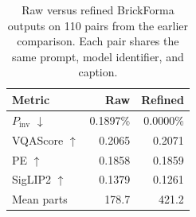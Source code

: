 \begin{table}[t]
\centering
\small
\begin{tabular}{lrr}
\toprule
Metric & Raw & Refined \\
\midrule
$P_{\mathrm{inv}}$ $\downarrow$ & 0.1897\% & 0.0000\% \\
VQAScore $\uparrow$ & 0.2065 & 0.2071 \\
PE $\uparrow$ & 0.1858 & 0.1859 \\
SigLIP2 $\uparrow$ & 0.1379 & 0.1261 \\
Mean parts & 178.7 & 421.2 \\
\bottomrule
\end{tabular}
\caption{Raw versus refined BrickForma outputs on 110 pairs from the earlier comparison. Each pair shares the same prompt, model identifier, and caption.}
\label{tab:raw-refined}
\end{table}
